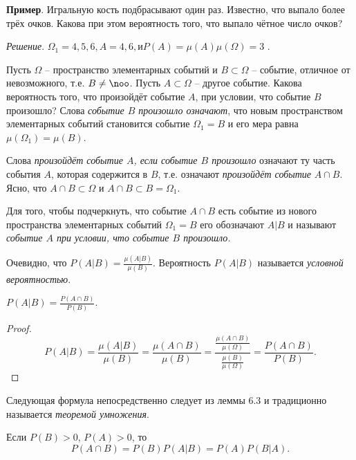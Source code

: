 \textbf{Пример}. Игральную кость подбрасывают один раз. Известно, что выпало более трёх очков. Какова при этом вероятность того, что выпало чётное число очков?

\textit{Решение}. $\Omega_1 = {4, 5, 6}, A = {4, 6}, и P(A) = \mu(A)
\mu(\Omega) = 3$ .

\begin{zam}
Пусть $\Omega$ -- пространство элементарных событий и $B \subset \Omega$ -- событие, отличное от невозможного, т.е. $B \ne \noo$. 
Пусть $A \subset \Omega$ – другое событие. Какова вероятность того, что произойдёт событие $A$, при условии,
что событие $B$ произошло? Слова \textit{событие $B$ произошло означают}, что новым пространством элементарных событий становится событие $\Omega_1 = B$ и его мера равна $\mu(\Omega_1 ) = \mu(B)$. 

Слова \textit{произойдёт событие $A$, если событие $B$
произошло} означают ту часть события $A$, которая содержится в $B$, т.е. означают \textit{произойдёт событие} $A \cap B$. Ясно, что $A \cap B \subset \Omega$ и $A \cap B \subset B = \Omega_1$.
\end{zam}

\begin{definition}
Для того, чтобы подчеркнуть, что событие $A \cap B$ есть
событие из нового пространства элементарных событий $\Omega_1 = B$ его обозначают $A|B$ и называют \textit{событие $A$ при условии, что событие $B$ произошло.}

Очевидно, что $P(A|B)=\frac{\mu(A|B)}{\mu(B)}$. Вероятность $P(A|B)$ называется \textit{условной вероятностью}.
\end{definition}

\begin{lemma}
	$P(A|B) = \frac{P(A\cap B)}{P(B)}$.
\end{lemma}

\begin{proof}
\begin{equation*}
	P(A|B) = \frac{\mu(A|B)}{\mu(B)}=\frac{\mu(A\cap B)}{\mu(B)}
=\frac{\frac{\mu(A\cap B)}{\mu(\Omega)}}{\frac{\mu(B)}{\mu(\Omega)}}
=\frac{P(A\cap B)}{P(B)}.
\end{equation*}	
\end{proof}

Следующая формула непосредственно следует из леммы 6.3 и традиционно называется \textit{теоремой умножения}.

\begin{theorem}
Если $P(B) > 0$, $P(A) > 0$, то
\begin{equation*}
	P(A \cap B) = P(B)P(A|B) = P(A)P(B|A).
\end{equation*}
\end{theorem}

